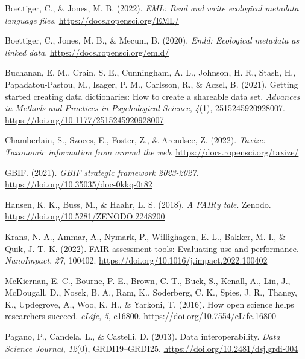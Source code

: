 \documentclass[
]{book}
\newlength{\cslhangindent}
\newlength{\cslentryspacingunit} %
\newenvironment{CSLReferences}[2] %
 {%
  \setlength{\parindent}{0pt}
  \ifodd #1
  \let\oldpar\par
  \def\par{\hangindent=\cslhangindent\oldpar}
  \fi
  \setlength{\parskip}{#2\cslentryspacingunit}
 }%
 {}
\begin{document}
\hypertarget{refs}{}
\begin{CSLReferences}{1}{0}
\leavevmode{}%
Boettiger, C., \& Jones, M. B. (2022). \emph{EML: Read and write ecological metadata language files}. \url{https://docs.ropensci.org/EML/}

\leavevmode{}%
Boettiger, C., Jones, M. B., \& Mecum, B. (2020). \emph{Emld: Ecological metadata as linked data}. \url{https://docs.ropensci.org/emld/}

\leavevmode{}%
Buchanan, E. M., Crain, S. E., Cunningham, A. L., Johnson, H. R., Stash, H., Papadatou-Pastou, M., Isager, P. M., Carlsson, R., \& Aczel, B. (2021). Getting started creating data dictionaries: How to create a shareable data set. \emph{Advances in Methods and Practices in Psychological Science}, \emph{4}(1), 2515245920928007. \url{https://doi.org/10.1177/2515245920928007}

\leavevmode{}%
Chamberlain, S., Szoecs, E., Foster, Z., \& Arendsee, Z. (2022). \emph{Taxize: Taxonomic information from around the web}. \url{https://docs.ropensci.org/taxize/}

\leavevmode{}%
GBIF. (2021). \emph{GBIF strategic framework 2023-2027}. \url{https://doi.org/10.35035/doc-0kkq-0t82}

\leavevmode{}%
Hansen, K. K., Buss, M., \& Haahr, L. S. (2018). \emph{A FAIRy tale}. Zenodo. \url{https://doi.org/10.5281/ZENODO.2248200}

\leavevmode{}%
Krans, N. A., Ammar, A., Nymark, P., Willighagen, E. L., Bakker, M. I., \& Quik, J. T. K. (2022). FAIR assessment tools: Evaluating use and performance. \emph{NanoImpact}, \emph{27}, 100402. \url{https://doi.org/10.1016/j.impact.2022.100402}

\leavevmode{}%
McKiernan, E. C., Bourne, P. E., Brown, C. T., Buck, S., Kenall, A., Lin, J., McDougall, D., Nosek, B. A., Ram, K., Soderberg, C. K., Spies, J. R., Thaney, K., Updegrove, A., Woo, K. H., \& Yarkoni, T. (2016). How open science helps researchers succeed. \emph{eLife}, \emph{5}, e16800. \url{https://doi.org/10.7554/eLife.16800}

\leavevmode{}%
Pagano, P., Candela, L., \& Castelli, D. (2013). Data interoperability. \emph{Data Science Journal}, \emph{12}(0), GRDI19--GRDI25. \url{https://doi.org/10.2481/dsj.grdi-004}


\end{CSLReferences}
\end{document}
